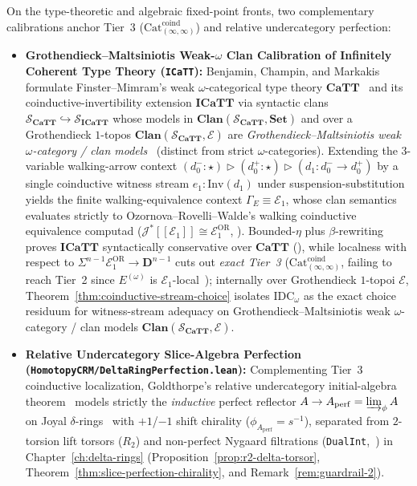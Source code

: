 \documentclass[10pt,twoside,openright]{book}
\theoremstyle{crmplain}
\theoremstyle{crmdef}
\theoremstyle{crmremark}
\begin{document}
On the type-theoretic and algebraic fixed-point fronts, two complementary calibrations anchor Tier~3 ($\mathrm{Cat}^{\mathrm{coind}}_{(\infty, \infty)}$) and relative undercategory perfection:
\begin{itemize}[leftmargin=1.5em]
  \item \textbf{Grothendieck--Maltsiniotis Weak-$\omega$ Clan Calibration of Infinitely Coherent Type Theory (\texttt{ICaTT}):} Benjamin, Champin, and Markakis~\cite{BCM26} formulate Finster--Mimram's weak $\omega$-categorical type theory $\mathbf{CaTT}$~\cite{FinsterMimram17} and its coinductive-invertibility extension $\mathbf{ICaTT}$ via syntactic clans $\mathcal{S}_{\mathbf{CaTT}} \hookrightarrow \mathcal{S}_{\mathbf{ICaTT}}$ whose models in $\mathbf{Clan}(\mathcal{S}_{\mathbf{CaTT}}, \mathbf{Set})$ and over a Grothendieck $1$-topos $\mathbf{Clan}(\mathcal{S}_{\mathbf{CaTT}}, \mathcal{E})$ are \emph{Grothendieck--Maltsiniotis weak $\omega$-category / clan models}~\cite{BCM26,ORW26} (distinct from strict $\omega$-categories). Extending the 3-variable walking-arrow context $(d_0^- : \star) \rhd (d_0^+ : \star) \rhd (d_1 : d_0^- \to d_0^+)$ by a single coinductive witness stream $e_1 : \mathrm{Inv}(d_1)$ under suspension-substitution yields the finite walking-equivalence context $\Gamma_E \equiv \mathcal{E}_1$, whose clan semantics evaluates strictly to Ozornova--Rovelli--Walde's walking coinductive equivalence computad ($\mathcal{J}^*[\![\mathcal{E}_1]\!] \cong \mathcal{E}_1^{\mathrm{OR}}$, \cite[Theorem~6.5]{BCM26}). Bounded-$\eta$ plus $\beta$-rewriting proves $\mathbf{ICaTT}$ syntactically conservative over $\mathbf{CaTT}$ (\cite[Proposition~4.6, Theorem~6.2]{BCM26}), while localness with respect to $\Sigma^{n-1}\mathcal{E}_1^{\mathrm{OR}} \to \mathbf{D}^{n-1}$ cuts out \emph{exact Tier~3} ($\mathrm{Cat}^{\mathrm{coind}}_{(\infty, \infty)}$, failing to reach Tier~2 since $E^{(\omega)}$ is $\mathcal{E}_1$-local~\cite[Corollary~5.56]{ORW26}); internally over Grothendieck $1$-topoi $\mathcal{E}$, Theorem~\ref{thm:coinductive-stream-choice} isolates $\mathrm{IDC}_\omega$ as the exact choice residuum for witness-stream adequacy on Grothendieck--Maltsiniotis weak $\omega$-category / clan models $\mathbf{Clan}(\mathcal{S}_{\mathbf{CaTT}}, \mathcal{E})$.

  \item \textbf{Relative Undercategory Slice-Algebra Perfection (\texttt{HomotopyCRM/\allowbreak DeltaRing\allowbreak Perfection.lean}):} Complementing Tier~3 coinductive localization, Goldthorpe's relative undercategory initial-algebra theorem~\cite[Proposition~2.3.13]{Goldthorpe23} models strictly the \emph{inductive} perfect reflector $A \to A_{\mathrm{perf}} = \varinjlim_\phi A$ on Joyal $\delta$-rings~\cite{Joyal85} with $+1$/$-1$ shift chirality ($\phi_{A_{\mathrm{perf}}} = s^{-1}$), separated from $2$-torsion lift torsors ($R_2$) and non-perfect Nygaard filtrations (\texttt{DualInt},~\cite{BhattScholze22}) in Chapter~\ref{ch:delta-rings} (Proposition~\ref{prop:r2-delta-torsor}, Theorem~\ref{thm:slice-perfection-chirality}, and Remark~\ref{rem:guardrail-2}).
\end{itemize}
\end{document}
